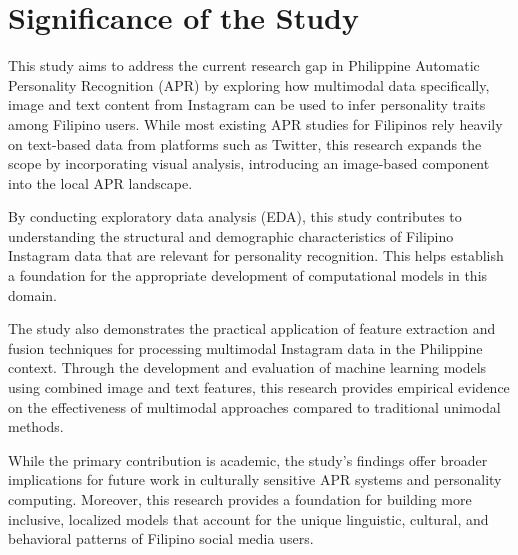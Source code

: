 
\section{Significance of the Study}
\label{sec: Significance}

This study aims to address the current research gap in Philippine Automatic Personality Recognition (APR) by exploring how multimodal data specifically, image and text content from Instagram can be used to infer personality traits among Filipino users. While most existing APR studies for Filipinos rely heavily on text-based data from platforms such as Twitter, this research expands the scope by incorporating visual analysis, introducing an image-based component into the local APR landscape.

By conducting exploratory data analysis (EDA), this study contributes to understanding the structural and demographic characteristics of Filipino Instagram data that are relevant for personality recognition. This helps establish a foundation for the appropriate development of computational models in this domain.

The study also demonstrates the practical application of feature extraction and fusion techniques for processing multimodal Instagram data in the Philippine context. Through the development and evaluation of machine learning models using combined image and text features, this research provides empirical evidence on the effectiveness of multimodal approaches compared to traditional unimodal methods.

While the primary contribution is academic, the study's findings offer broader implications for future work in culturally sensitive APR systems and personality computing. Moreover, this research provides a foundation for building more inclusive, localized models that account for the unique linguistic, cultural, and behavioral patterns of Filipino social media users.




